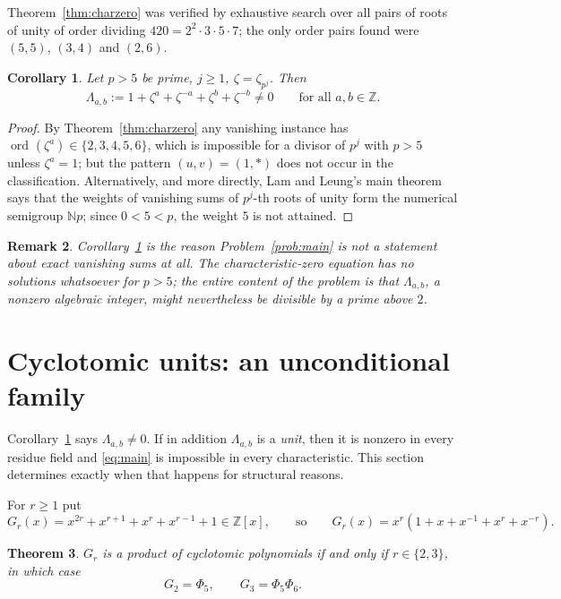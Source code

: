\documentclass[a4paper]{article}
\newtheorem{theorem}{Theorem}[section]
\newtheorem{corollary}[theorem]{Corollary}
\newtheorem{remark}[theorem]{Remark}
\newcommand{\Z}{\mathbb{Z}}
\newcommand{\N}{\mathbb{N}}
\newcommand{\ord}[2][]{\operatorname{ord}_{#1}\!\left(#2\right)}
\begin{document}
Theorem~\ref{thm:charzero} was verified by exhaustive search over all pairs
of roots of unity of order dividing $420=2^2\cdot3\cdot5\cdot7$; the only
order pairs found were $(5,5)$, $(3,4)$ and $(2,6)$.

\begin{corollary}\label{cor:charzero-pj}
	Let $p>5$ be prime, $j\geq1$, $\zeta=\zeta_{p^j}$.
	Then
	\[
		\Lambda_{a,b}:=1+\zeta^{a}+\zeta^{-a}+\zeta^{b}+\zeta^{-b}\ne0
		\qquad\text{for all }a,b\in\Z .
	\]
\end{corollary}

\begin{proof}
	By Theorem~\ref{thm:charzero} any vanishing instance has
	$\ord{\zeta^a}\in\{2,3,4,5,6\}$, which is impossible for a divisor of
	$p^j$ with $p>5$ unless $\zeta^a=1$; but the pattern $(u,v)=(1,\ast)$
	does not occur in the classification.
	Alternatively, and more directly, Lam and Leung's main theorem
	\cite[Main Theorem]{LamLeung2000} says that the weights of vanishing
	sums of $p^j$-th roots of unity form the numerical semigroup
	$\N p$; since $0<5<p$, the weight $5$ is not attained.
\end{proof}

\begin{remark}
	Corollary~\ref{cor:charzero-pj} is the reason Problem~\ref{prob:main}
	is not a statement about exact vanishing sums at all.
	The characteristic-zero equation has \emph{no} solutions whatsoever for
	$p>5$; the entire content of the problem is that
	$\Lambda_{a,b}$, a nonzero algebraic integer, might nevertheless be
	divisible by a prime above $2$.
\end{remark}

\section{Cyclotomic units: an unconditional family}\label{sec:units}

Corollary~\ref{cor:charzero-pj} says $\Lambda_{a,b}\ne0$.
If in addition $\Lambda_{a,b}$ is a \emph{unit}, then it is nonzero in every
residue field and \eqref{eq:main} is impossible in every characteristic.
This section determines exactly when that happens for structural reasons.

For $r\geq1$ put
\[
	G_r(x)=x^{2r}+x^{r+1}+x^{r}+x^{r-1}+1\in\Z[x],
	\qquad\text{so}\qquad
	G_r(x)=x^{r}\left(1+x+x^{-1}+x^{r}+x^{-r}\right).
\]

\begin{theorem}\label{thm:units}
	$G_r$ is a product of cyclotomic polynomials if and only if
	$r\in\{2,3\}$, in which case
	\[
		G_2=\Phi_5,
		\qquad
		G_3=\Phi_5\Phi_6 .
	\]
\end{theorem}
\end{document}
